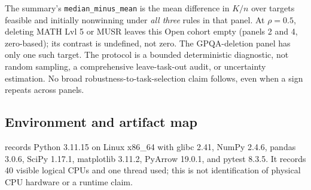 The summary's \texttt{median\_minus\_mean} is the mean difference in $K/n$ over targets feasible and initially nonwinning under \emph{all three} rules in that panel. At $\rho=0.5$, deleting MATH Lvl 5 or MUSR leaves this Open cohort empty (panels 2 and 4, zero-based); its contrast is undefined, not zero. The GPQA-deletion panel has only one such target. The protocol is a bounded deterministic diagnostic, not random sampling, a comprehensive leave-task-out audit, or uncertainty estimation. No broad robustness-to-task-selection claim follows, even when a sign repeats across panels.

\subsection{Environment and artifact map}
\label{app:files}
 records Python 3.11.15 on Linux x86\_64 with glibc 2.41, NumPy 2.4.6, pandas 3.0.6, SciPy 1.17.1, matplotlib 3.11.2, PyArrow 19.0.1, and pytest 8.3.5. It records 40 visible logical CPUs and one thread used; this is not identification of physical CPU hardware or a runtime claim.

